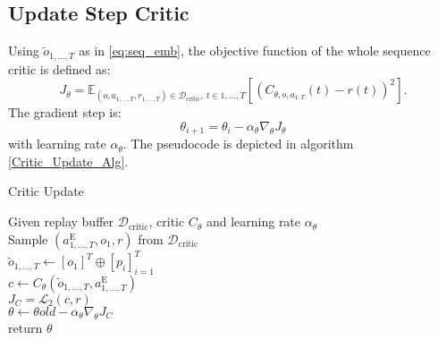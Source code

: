 \subsection{Update Step Critic}
Using $\tilde{o}_{1, ..., T}$ as in \ref{eq:seq_emb}, the objective function of the whole sequence critic is defined as:
\begin{equation}
    J_{\theta} = \mathbb{E}_{(o, a_{1,...,T}, r_{1,...,T}) \in \mathcal{D}_{\text{critic}},\ t \in {1, ..., T}}\left[(C_{\theta, o, a_{1:T}}(t) - r(t))^2\right].
\end{equation}
The gradient step is:
\begin{equation*}
    \theta_{i+1} = \theta_i - \alpha_{\theta} \nabla_{\theta}J_{\theta}
\end{equation*}
with learning rate $\alpha_{\theta}$. The pseudocode is depicted in algorithm \ref{Critic_Update_Alg}.
\begin{algorithm}
    \caption{Critic Update}
    \label{Critic_Update_Alg}
    \begin{algorithmic}
    \Require Given replay buffer $\mathcal{D}_{\text{critic}}$, critic $C_{\theta}$ and learning rate $\alpha_{\theta}$\\
    \State Sample $(a^{\text{E}}_{1, ..., T}, o_1, r)$ from $\mathcal{D}_{\text{critic}}$\\
    \State $\tilde{o}_{1, ..., T} \gets [o_1]^T \oplus [p_i]_{i=1}^T$ \hfill{} \\
    \State $c \gets C_{\theta}(\tilde{o}_{1, ..., T}, a^{\text{E}}_{1, ..., T})$\hfill{} \\
    
    \State $J_{C} = \mathcal{L}_2(c, r)$ \hfill{} \\
    \State $\theta \gets \theta{old} - \alpha_{\theta} \nabla_{\theta}J_{C}$\\
    \State return $\theta$
\end{algorithmic}
\end{algorithm}
